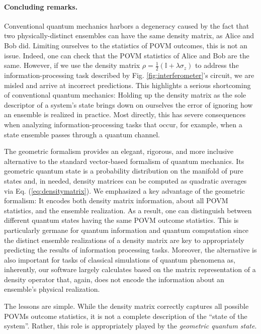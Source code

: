 \documentclass[draft,nofootinbib,prl,twocolumn,showpacs,showkeys,groupaddress,preprintnumbers,floatfix]{revtex4-1}
\newcommand{\1}{\mathbbm{1}}
\begin{document}
\paragraph*{Concluding remarks.}
Conventional quantum mechanics harbors a degeneracy caused by the
fact that two physically-distinct ensembles can have the same density matrix,
as Alice and Bob did. Limiting ourselves to the statistics of POVM outcomes,
this is not an issue. Indeed, one can check that the POVM statistics of Alice
and Bob are the same. However, if we use the density matrix $\rho =
\frac{1}{2}\left( \mathbb{I} + \lambda \sigma_z\right)$ to address the
information-processing task described by Fig. \ref{fig:interferometer}'s
circuit, we are misled and arrive at incorrect predictions. This highlights a
serious shortcoming of conventional quantum mechanics: Holding up the density
matrix as the sole descriptor of a system's state brings down on ourselves
the error of ignoring how an ensemble is realized in practice. Most directly,
this has severe consequences when analyzing information-processing tasks that
occur, for example, when a state ensemble passes through a quantum channel.

The geometric formalism provides an elegant, rigorous, and more inclusive
alternative to the standard vector-based formalism of quantum mechanics. Its
geometric quantum state is a probability distribution on the manifold of pure
states and, in needed, density matrices can be computed as quadratic averages
via Eq. (\ref{eq:densitymatrix}). We emphasized a key advantage of the
geometric formalism: It encodes both density matrix information, about all POVM
statistics, and the ensemble realization. As a result, one can distinguish
between different quantum states having the same POVM outcome statistics. This
is particularly germane for quantum information and quantum computation since
the distinct ensemble realizations of a density matrix are key to appropriately
predicting the results of information processing tasks. Moreover, the
alternative is also important for tasks of classical simulations of quantum
phenomena as, inherently, our software largely calculates based on the matrix
representation of a density operator that, again, does not encode the
information about an ensemble's physical realization.

The lessons are simple. While the density matrix correctly captures all
possible POVMs outcome statistics, it is not a complete description of the
``state of the system''. Rather, this role is appropriately played by the
\emph{geometric quantum state}.
\end{document}
